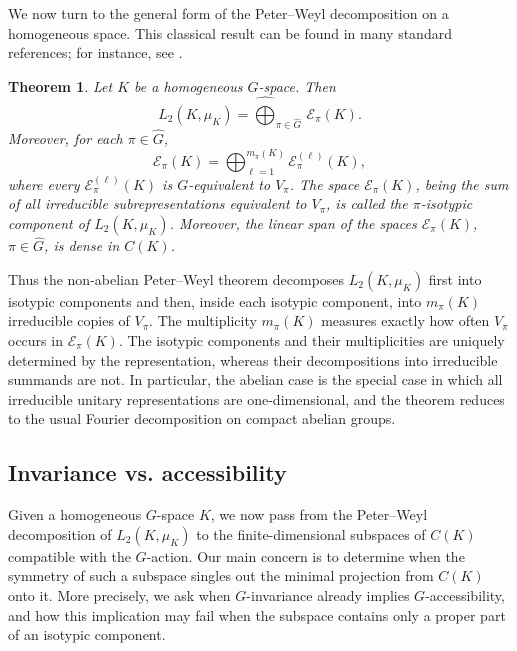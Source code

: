 \documentclass[11pt,showkeys]{amsart}
\newtheorem{theorem}{Theorem}[section]
\begin{document}
We now turn to the general form of the Peter--Weyl decomposition on a homogeneous space. This classical result can be found in many standard references; for instance, see \cite{deitmar2014,folland2016course,fulton2013representation,takeuchi1994modern}.


\begin{theorem}
\label{thm:homogeneous-peter-weyl}
Let \(K\) be a homogeneous \(G\)-space. Then
\[
        L_2(K,\mu_K)
        =
        \widehat{\bigoplus}_{\pi\in\widehat G}\,
        \mathcal E_\pi(K).
\]
Moreover, for each \(\pi\in\widehat G\),
\[
        \mathcal E_\pi(K)
        =
        \bigoplus_{\ell=1}^{m_\pi(K)}
        \mathcal E_\pi^{(\ell)}(K),
\]
where every \(\mathcal E_\pi^{(\ell)}(K)\) is \(G\)-equivalent to
\(V_\pi\). The space \(\mathcal E_\pi(K)\), being the sum of all
irreducible subrepresentations equivalent to \(V_\pi\), is called the
\(\pi\)-isotypic component of \(L_2(K,\mu_K)\).
Moreover, the linear span of the spaces
\(\mathcal E_\pi(K)\), \(\pi\in\widehat G\), is dense in \(C(K)\).
\end{theorem}


Thus the non-abelian Peter--Weyl theorem decomposes \(L_2(K,\mu_K)\)
first into isotypic components and then, inside each isotypic component,
into \(m_\pi(K)\) irreducible copies of \(V_\pi\). The multiplicity
\(m_\pi(K)\) measures exactly how often \(V_\pi\) occurs in
\(\mathcal E_\pi(K)\). The isotypic components and their multiplicities are uniquely determined by the representation, whereas their decompositions into irreducible summands are not. In particular, the abelian case is the special
case in which all irreducible unitary representations are one-dimensional,
and the theorem reduces to the usual Fourier decomposition on compact
abelian groups.

\subsection{Invariance vs. accessibility}
Given a homogeneous \(G\)-space \(K\), we now pass from the Peter--Weyl
decomposition of \(L_2(K,\mu_K)\) to the finite-dimensional subspaces of $C(K)$
compatible with the \(G\)-action. Our main concern is to determine when
the symmetry of such a subspace singles out the minimal projection from $C(K)$ onto
it. More precisely, we ask when \(G\)-invariance already implies
\(G\)-accessibility, and how this implication may fail when the subspace
contains only a proper part of an isotypic component.
\end{document}
